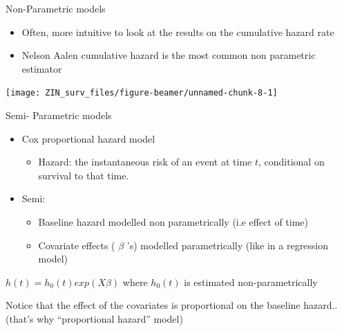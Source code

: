 \documentclass[
  ignorenonframetext,
]{beamer}
\providecommand{\tightlist}{%
  \setlength{\itemsep}{0pt}\setlength{\parskip}{0pt}}
\begin{document}
\begin{frame}{Non-Parametric models}
\protect\hypertarget{non-parametric-models-2}{}

\begin{itemize}
\tightlist
\item
  Often, more intuitive to look at the results on the cumulative hazard
  rate
\item
  Nelson Aalen cumulative hazard is the most common non parametric
  estimator
\end{itemize}

\texttt{[image: ZIN\_surv\_files/figure-beamer/unnamed-chunk-8-1]}

\end{frame}

\begin{frame}{Semi- Parametric models}
\protect\hypertarget{semi--parametric-models}{}

\begin{itemize}
\tightlist
\item
  Cox proportional hazard model

  \begin{itemize}
  \tightlist
  \item
    Hazard: the instantaneous risk of an event at time \(t\),
    conditional on survival to that time.
  \end{itemize}
\item
  Semi:

  \begin{itemize}
  \tightlist
  \item
    Baseline hazard modelled non parametrically (i.e effect of time)
  \item
    Covariate effects ( \(\beta\) 's) modelled parametrically (like in a
    regression model)
  \end{itemize}
\end{itemize}

\(h(t) = h_0(t)exp(X\beta)\) where \(h_0(t)\) is estimated
non-parametrically

Notice that the effect of the covariates is proportional on the baseline
hazard..(that's why ``proportional hazard'' model)

\end{frame}
\end{document}
